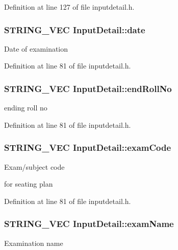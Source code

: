Definition at line 127 of file inputdetail.\-h.

\hypertarget{classInputDetail_a7d1c7ceb33eb86058e00c3a6a68cae4a}{
\subsubsection[{date}]{\setlength{\rightskip}{0pt plus 5cm}S\-T\-R\-I\-N\-G\-\_\-\-V\-E\-C Input\-Detail\-::date\hspace{0.3cm}{\ttfamily [protected]}}}\label{classInputDetail_a7d1c7ceb33eb86058e00c3a6a68cae4a}
Date of examination 

Definition at line 81 of file inputdetail.\-h.

\hypertarget{classInputDetail_abc3249eab8fbf895620deff0a9349333}{
\subsubsection[{end\-Roll\-No}]{\setlength{\rightskip}{0pt plus 5cm}S\-T\-R\-I\-N\-G\-\_\-\-V\-E\-C Input\-Detail\-::end\-Roll\-No\hspace{0.3cm}{\ttfamily [protected]}}}\label{classInputDetail_abc3249eab8fbf895620deff0a9349333}
ending roll no 

Definition at line 81 of file inputdetail.\-h.

\hypertarget{classInputDetail_ac48c0170ce354d3cd188ddc2e83e2c67}{
\subsubsection[{exam\-Code}]{\setlength{\rightskip}{0pt plus 5cm}S\-T\-R\-I\-N\-G\-\_\-\-V\-E\-C Input\-Detail\-::exam\-Code\hspace{0.3cm}{\ttfamily [protected]}}}\label{classInputDetail_ac48c0170ce354d3cd188ddc2e83e2c67}
\begin{DoxyVerb} Exam/subject code 
\end{DoxyVerb}
 for seating plan 

Definition at line 81 of file inputdetail.\-h.

\hypertarget{classInputDetail_a7b4e4a2a26f23da75d9928601a88a1d9}{
\subsubsection[{exam\-Name}]{\setlength{\rightskip}{0pt plus 5cm}S\-T\-R\-I\-N\-G\-\_\-\-V\-E\-C Input\-Detail\-::exam\-Name\hspace{0.3cm}{\ttfamily [protected]}}}\label{classInputDetail_a7b4e4a2a26f23da75d9928601a88a1d9}
Examination name 

